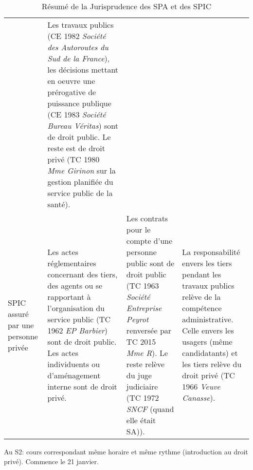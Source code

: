 \documentclass[math]{cours}
\begin{document}
\begin{table}
\begin{tabular}{p{.2\linewidth}p{.2\linewidth}p{.2\linewidth}p{.2\linewidth}}
	& Les travaux publics (CE 1982 \emph{Société des Autoroutes du Sud de la France}), les décisions mettant en oeuvre une prérogative de puissance publique (CE 1983 \emph{Société Bureau Véritas}) sont de droit public. Le reste est de droit privé (TC 1980 \emph{Mme Girinon} sur la gestion planifiée du service public de la santé).
	\\
	SPIC assuré par une personne privée
	& Les actes réglementaires concernant des tiers, des agents ou se rapportant à l'organisation du service public (TC 1962 \emph{EP Barbier}) sont de droit public. Les actes individuents ou d'aménagement interne sont de droit privé.
	& Les contrats pour le compte d'une personne public sont de droit public (TC 1963 \emph{Société Entreprise Peyrot} renversée par TC 2015 \emph{Mme R}). Le reste relève du juge judiciaire (TC 1972 \emph{SNCF} (quand elle était SA)).
	& La responsabilité envers les tiers pendant les travaux publics relève de la compétence administrative. Celle envers les usagers (même candidatants) et les tiers relève du droit privé (TC 1966 \emph{Veuve Canasse}).
	\end{tabular}
	\caption{Résumé de la Jurisprudence des SPA et des SPIC}
\end{table}

Au S2: cours correspondant même horaire et même rythme (introduction au droit privé). Commence le 21 janvier.
\end{document}
